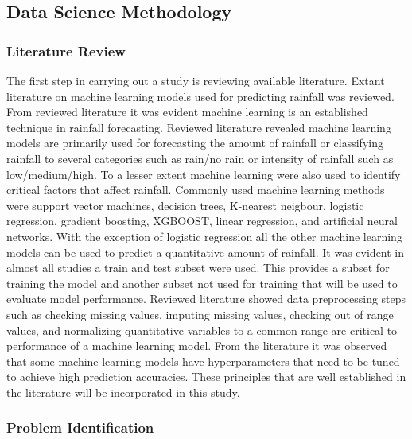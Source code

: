 \documentclass{article}
\begin{document}
\subsection{Data Science Methodology}


\subsubsection{Literature Review}

The first step in carrying out a study is reviewing available literature. Extant literature on
machine learning models used for predicting rainfall was reviewed. From reviewed literature
it was evident machine learning is an established technique in rainfall forecasting. Reviewed
literature revealed machine learning models are primarily used for forecasting the amount of
rainfall or classifying rainfall to several categories such as rain/no rain or intensity of rainfall
such as low/medium/high. To a lesser extent machine learning were also used to identify
critical factors that affect rainfall. Commonly used machine learning methods were support
vector machines, decision trees, K-nearest neigbour, logistic regression, gradient boosting,
XGBOOST, linear regression, and artificial neural networks. With the exception of logistic
regression all the other machine learning models can be used to predict a quantitative amount
of rainfall. It was evident in almost all studies a train and test subset were used. This provides
a subset for training the model and another subset not used for training that will be used to
evaluate model performance. Reviewed literature showed data preprocessing steps such as
checking missing values, imputing missing values, checking out of range values, and
normalizing quantitative variables to a common range are critical to performance of a machine
learning model. From the literature it was observed that some machine learning models have
hyperparameters that need to be tuned to achieve high prediction accuracies. These principles
that are well established in the literature will be incorporated in this study.

\subsubsection{Problem Identification}
\end{document}
